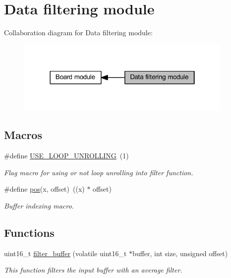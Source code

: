 \hypertarget{group___filter__module__group}{}\section{Data filtering module}
\label{group___filter__module__group}
Collaboration diagram for Data filtering module\+:\nopagebreak
\begin{figure}[H]
\begin{center}
\leavevmode
\includegraphics[width=298pt]{group___filter__module__group}
\end{center}
\end{figure}
\subsection*{Macros}
\begin{DoxyCompactItemize}
\item 
\mbox{\label{group___filter__module__group_ga1646c21a91b653eeb516c9d508c1cab6}} 
\#define \mbox{\hyperlink{group___filter__module__group_ga1646c21a91b653eeb516c9d508c1cab6}{U\+S\+E\+\_\+\+L\+O\+O\+P\+\_\+\+U\+N\+R\+O\+L\+L\+I\+NG}}~(1)
\begin{DoxyCompactList}\small\item\em Flag macro for using or not loop unrolling into filter function. \end{DoxyCompactList}\item 
\mbox{\label{group___filter__module__group_gaa505bfa61df2c48cb76be56720dae3d1}} 
\#define \mbox{\hyperlink{group___filter__module__group_gaa505bfa61df2c48cb76be56720dae3d1}{pos}}(x,  offset)~((x) $\ast$ offset)
\begin{DoxyCompactList}\small\item\em Buffer indexing macro. \end{DoxyCompactList}\end{DoxyCompactItemize}
\subsection*{Functions}
\begin{DoxyCompactItemize}
\item 
uint16\+\_\+t \mbox{\hyperlink{group___filter__module__group_ga676952eee893902e5a15b3f5adca1f86}{filter\+\_\+buffer}} (volatile uint16\+\_\+t $\ast$buffer, int size, unsigned offset)
\begin{DoxyCompactList}\small\item\em This function filters the input buffer with an average filter. \end{DoxyCompactList}\end{DoxyCompactItemize}


